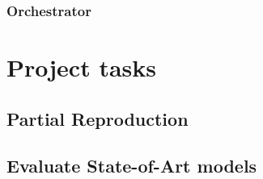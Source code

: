 \documentclass[conference]{IEEEtran}
\begin{document}
\subsubsection{Orchestrator}


\section{Project tasks}

\subsection{Partial Reproduction}
\subsection{Evaluate State-of-Art models}









\vspace{12pt}
\end{document}
